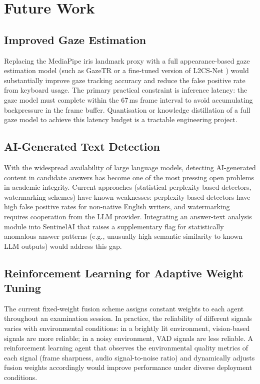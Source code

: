 \section{Future Work}

\subsection{Improved Gaze Estimation}

Replacing the MediaPipe iris landmark proxy with a full appearance-based gaze estimation model (such as GazeTR \cite{cheng2022} or a fine-tuned version of L2CS-Net \cite{abdelrahman2023}) would substantially improve gaze tracking accuracy and reduce the false positive rate from keyboard usage. The primary practical constraint is inference latency: the gaze model must complete within the 67\,ms frame interval to avoid accumulating backpressure in the frame buffer. Quantisation or knowledge distillation of a full gaze model to achieve this latency budget is a tractable engineering project.

\subsection{AI-Generated Text Detection}

With the widespread availability of large language models, detecting AI-generated content in candidate answers has become one of the most pressing open problems in academic integrity. Current approaches (statistical perplexity-based detectors, watermarking schemes) have known weaknesses: perplexity-based detectors have high false positive rates for non-native English writers, and watermarking requires cooperation from the LLM provider. Integrating an answer-text analysis module into SentinelAI that raises a supplementary flag for statistically anomalous answer patterns (e.g., unusually high semantic similarity to known LLM outputs) would address this gap.

\subsection{Reinforcement Learning for Adaptive Weight Tuning}

The current fixed-weight fusion scheme assigns constant weights to each agent throughout an examination session. In practice, the reliability of different signals varies with environmental conditions: in a brightly lit environment, vision-based signals are more reliable; in a noisy environment, VAD signals are less reliable. A reinforcement learning agent that observes the environmental quality metrics of each signal (frame sharpness, audio signal-to-noise ratio) and dynamically adjusts fusion weights accordingly would improve performance under diverse deployment conditions.


